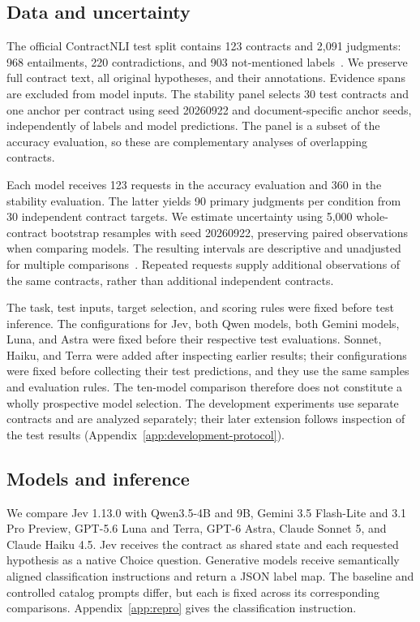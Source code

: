 \documentclass{article}
\begin{document}
\subsection{Data and uncertainty}
The official ContractNLI test split contains 123 contracts and 2,091 judgments: 968 entailments, 220 contradictions, and 903 not-mentioned labels~\citep{koreeda2021contractnli}. We preserve full contract text, all original hypotheses, and their annotations. Evidence spans are excluded from model inputs. The stability panel selects 30 test contracts and one anchor per contract using seed 20260922 and document-specific anchor seeds, independently of labels and model predictions. The panel is a subset of the accuracy evaluation, so these are complementary analyses of overlapping contracts.

Each model receives 123 requests in the accuracy evaluation and 360 in the stability evaluation. The latter yields 90 primary judgments per condition from 30 independent contract targets. We estimate uncertainty using 5,000 whole-contract bootstrap resamples with seed 20260922, preserving paired observations when comparing models. The resulting intervals are descriptive and unadjusted for multiple comparisons~\citep{dror2018hitchhiker}. Repeated requests supply additional observations of the same contracts, rather than additional independent contracts.

The task, test inputs, target selection, and scoring rules were fixed before test inference. The configurations for Jev, both Qwen models, both Gemini models, Luna, and Astra were fixed before their respective test evaluations. Sonnet, Haiku, and Terra were added after inspecting earlier results; their configurations were fixed before collecting their test predictions, and they use the same samples and evaluation rules. The ten-model comparison therefore does not constitute a wholly prospective model selection. The development experiments use separate contracts and are analyzed separately; their later extension follows inspection of the test results (Appendix~\ref{app:development-protocol}).

\subsection{Models and inference}
We compare Jev 1.13.0 with Qwen3.5-4B and 9B, Gemini 3.5 Flash-Lite and 3.1 Pro Preview, GPT-5.6 Luna and Terra, GPT-6 Astra, Claude Sonnet 5, and Claude Haiku 4.5. Jev receives the contract as shared state and each requested hypothesis as a native Choice question. Generative models receive semantically aligned classification instructions and return a JSON label map. The baseline and controlled catalog prompts differ, but each is fixed across its corresponding comparisons. Appendix~\ref{app:repro} gives the classification instruction.
\end{document}
